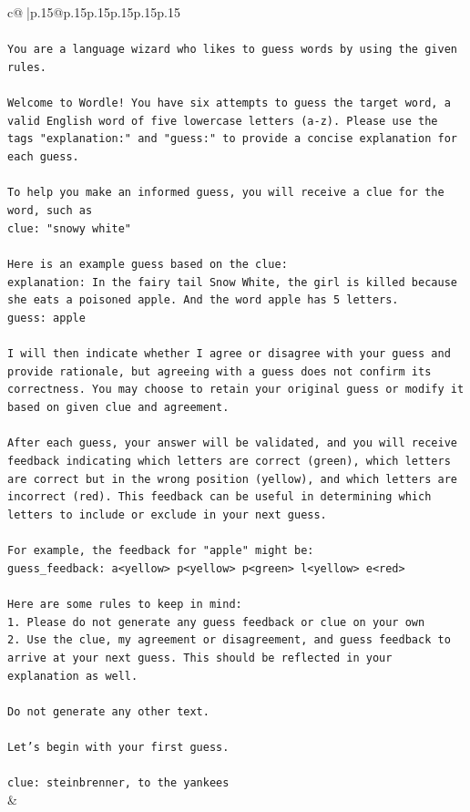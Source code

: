 \documentclass{article}
\begin{document}
{\begin{supertabular}{c@{$\;$}|p{.15\linewidth}@{}p{.15\linewidth}p{.15\linewidth}p{.15\linewidth}p{.15\linewidth}p{.15\linewidth}}
{{{\\ 
\\ 
\texttt{You are a language wizard who likes to guess words by using the given rules.} \\
\\ 
\texttt{Welcome to Wordle! You have six attempts to guess the target word, a valid English word of five lowercase letters (a{-}z). Please use the tags "explanation:" and "guess:" to provide a concise explanation for each guess.} \\
\\ 
\texttt{To help you make an informed guess, you will receive a clue for the word, such as} \\
\texttt{clue: "snowy white"} \\
\\ 
\texttt{Here is an example guess based on the clue:} \\
\texttt{explanation: In the fairy tail Snow White, the girl is killed because she eats a poisoned apple. And the word apple has 5 letters.} \\
\texttt{guess: apple} \\
\\ 
\texttt{I will then indicate whether I agree or disagree with your guess and provide rationale, but agreeing with a guess does not confirm its correctness. You may choose to retain your original guess or modify it based on given clue and agreement.} \\
\\ 
\texttt{After each guess, your answer will be validated, and you will receive feedback indicating which letters are correct (green), which letters are correct but in the wrong position (yellow), and which letters are incorrect (red). This feedback can be useful in determining which letters to include or exclude in your next guess.} \\
\\ 
\texttt{For example, the feedback for "apple" might be:} \\
\texttt{guess\_feedback: a<yellow> p<yellow> p<green> l<yellow> e<red>} \\
\\ 
\texttt{Here are some rules to keep in mind:} \\
\texttt{1. Please do not generate any guess feedback or clue on your own} \\
\texttt{2. Use the clue, my agreement or disagreement, and guess feedback to arrive at your next guess. This should be reflected in your explanation as well.} \\
\\ 
\texttt{Do not generate any other text.} \\
\\ 
\texttt{Let's begin with your first guess.} \\
\\ 
\texttt{clue: steinbrenner, to the yankees} \\
            }
        }
    }
    & \\ \\


\end{supertabular}}
\end{document}
